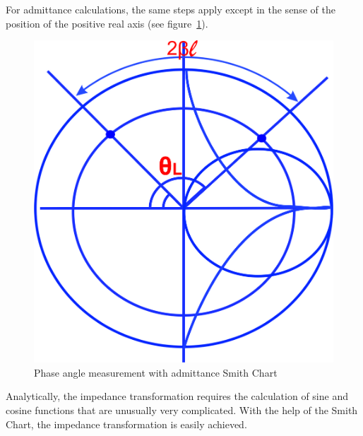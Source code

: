 For admittance calculations, the same steps apply except in the sense of the position of the positive real axis (see figure~\ref{fig:dfyui}).
\begin{figure}[h]
\centering
\includegraphics[width=0.7\linewidth]{./graphics/dfyui}
\caption{Phase angle measurement with admittance Smith Chart}
\label{fig:dfyui}
\end{figure}

Analytically, the impedance transformation requires the calculation of sine and cosine functions that are unusually very complicated. With the help of the Smith Chart, the impedance transformation is easily achieved.

